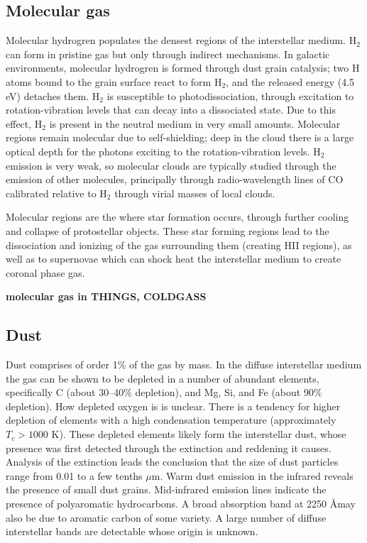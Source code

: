 \subsection{Molecular gas}

Molecular hydrogren populates the densest regions of the interstellar
medium. H$_2$ can form in pristine gas but only through indirect
mechanisms. In galactic environments, molecular hydrogren is formed
through dust grain catalysis; two H atoms bound to the grain surface
react to form H$_2$, and the released energy (4.5 eV) detaches
them. H$_2$ is susceptible to photodissociation, through excitation to
rotation-vibration levels that can decay into a dissociated state. Due
to this effect, H$_2$ is present in the neutral medium in very small
amounts. Molecular regions remain molecular due to self-shielding;
deep in the cloud there is a large optical depth for the photons
exciting to the rotation-vibration levels. H$_2$ emission is very
weak, so molecular clouds are typically studied through the emission
of other molecules, principally through radio-wavelength lines of CO
calibrated relative to H$_2$ through virial masses of local clouds.

Molecular regions are the where star formation occurs, through further
cooling and collapse of protostellar objects. These star forming
regions lead to the dissociation and ionizing of the gas surrounding
them (creating HII regions), as well as to supernovae which can shock
heat the interstellar medium to create coronal phase gas.

{\bf molecular gas in THINGS, COLDGASS}

\subsection{Dust}

Dust comprises of order 1\% of the gas by mass. In the diffuse
interstellar medium the gas can be shown to be depleted in a number of
abundant elements, specifically C (about 30--40\% depletion), and Mg,
Si, and Fe (about 90\% depletion). How depleted oxygen is is unclear.
There is a tendency for higher depletion of elements with a high
condensation temperature (approximately $T_c>1000$ K). These depleted
elements likely form the interstellar dust, whose presence was first
detected through the extinction and reddening it causes. Analysis of
the extinction leads the conclusion that the size of dust particles
range from 0.01 to a few tenths $\mu$m. Warm dust emission in the
infrared reveals the presence of small dust grains. Mid-infrared
emission lines indicate the presence of polyaromatic hydrocarbons. A
broad absorption band at 2250 \AA may also be due to aromatic carbon
of some variety. A large number of diffuse interstellar bands are
detectable whose origin is unknown.

